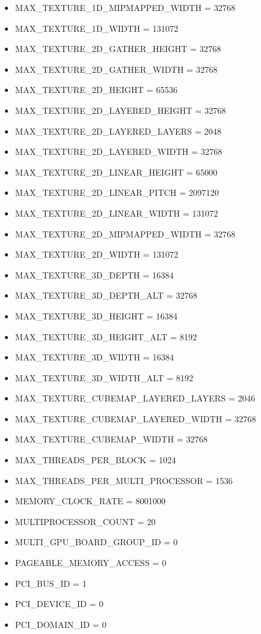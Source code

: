 \documentclass{article}
\begin{document}
\begin{itemize}
    \item MAX\_TEXTURE\_1D\_MIPMAPPED\_WIDTH = 32768
    \item MAX\_TEXTURE\_1D\_WIDTH = 131072
    \item MAX\_TEXTURE\_2D\_GATHER\_HEIGHT = 32768
    \item MAX\_TEXTURE\_2D\_GATHER\_WIDTH = 32768
    \item MAX\_TEXTURE\_2D\_HEIGHT = 65536
    \item MAX\_TEXTURE\_2D\_LAYERED\_HEIGHT = 32768
    \item MAX\_TEXTURE\_2D\_LAYERED\_LAYERS = 2048
    \item MAX\_TEXTURE\_2D\_LAYERED\_WIDTH = 32768
    \item MAX\_TEXTURE\_2D\_LINEAR\_HEIGHT = 65000
    \item MAX\_TEXTURE\_2D\_LINEAR\_PITCH = 2097120
    \item MAX\_TEXTURE\_2D\_LINEAR\_WIDTH = 131072
    \item MAX\_TEXTURE\_2D\_MIPMAPPED\_WIDTH = 32768
    \item MAX\_TEXTURE\_2D\_WIDTH = 131072
    \item MAX\_TEXTURE\_3D\_DEPTH = 16384
    \item MAX\_TEXTURE\_3D\_DEPTH\_ALT = 32768
    \item MAX\_TEXTURE\_3D\_HEIGHT = 16384
    \item MAX\_TEXTURE\_3D\_HEIGHT\_ALT = 8192
    \item MAX\_TEXTURE\_3D\_WIDTH = 16384
    \item MAX\_TEXTURE\_3D\_WIDTH\_ALT = 8192
    \item MAX\_TEXTURE\_CUBEMAP\_LAYERED\_LAYERS = 2046
    \item MAX\_TEXTURE\_CUBEMAP\_LAYERED\_WIDTH = 32768
    \item MAX\_TEXTURE\_CUBEMAP\_WIDTH = 32768
    \item MAX\_THREADS\_PER\_BLOCK = 1024
    \item MAX\_THREADS\_PER\_MULTI\_PROCESSOR = 1536
    \item MEMORY\_CLOCK\_RATE = 8001000
    \item MULTIPROCESSOR\_COUNT = 20
    \item MULTI\_GPU\_BOARD\_GROUP\_ID = 0
    \item PAGEABLE\_MEMORY\_ACCESS = 0
    \item PCI\_BUS\_ID = 1
    \item PCI\_DEVICE\_ID = 0
    \item PCI\_DOMAIN\_ID = 0

\end{itemize}
\end{document}
